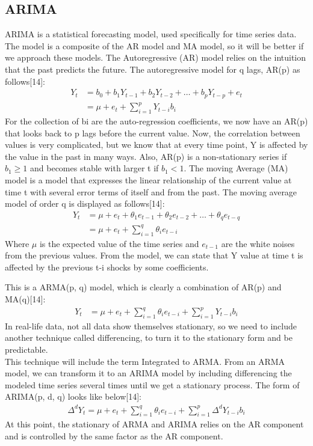 \documentclass{ieeeojies}
\begin{document}
\subsection{ARIMA}
ARIMA is a statistical forecasting model, used specifically for time series data. The model is a composite of the AR model and MA model, so it will be better if we approach these models.
The Autoregressive (AR) model relies on the intuition that the past predicts the future. The autoregressive model for q lags, AR(p) as follows[14]:
\begin{align*}
  Y_t &= b_0 + b_1 Y_{t-1} + b_2 Y_{t-2} + \ldots + b_p Y_{t-p} + e_t \\
      &= \mu + e_t + \sum_{i=1}^{p} Y_{t-i}b_i
\end{align*}
\indent For the collection of bi are the auto-regression coefficients, we now have an AR(p) that looks back to p lags before the current value. Now, the correlation between values is very complicated, but we know that at every time point, Y is affected by the value in the past in many ways. Also, AR(p) is a non-stationary series if $b_1 \geq 1$ and becomes stable with larger t if $b_1 < 1$.
The moving Average (MA) model is a model that expresses the linear relationship of the current value at time t with several error terms of itself and from the past. The moving average model of order q is displayed as follows[14]:
\begin{align*}
Y_t &= \mu + e_t + \theta_1 e_{t-1} + \theta_2 e_{t-2} + \ldots + \theta_q e_{t-q} \\
    &= \mu + e_t + \sum_{i=1}^{q} \theta_i e_{t-i}
\end{align*}
\indent Where $\mu $ is the expected value of the time series and $e_{t-1}$ are the white noises from the previous values. From the model, we can state that Y value at time t is affected by the previous t-i shocks by some coefficients.  

This is a ARMA(p, q) model, which is clearly a combination of AR(p) and MA(q)[14]:
\begin{align*}
Y_t &= \mu + e_t + \sum_{i=1}^{q} \theta_i e_{t-i} + \sum_{i=1}^{p} Y_{t-i} b_i
\end{align*}
In real-life data, not all data show themselves stationary, so we need to include another technique called differencing, to turn it to the stationary form and be predictable.\\
\indent This technique will include the term Integrated to ARMA. From an ARMA model, we can transform it to an ARIMA model by including differencing the modeled time series several times until we get a stationary process. The form of ARIMA(p, d, q) looks like below[14]:
\begin{align*}
\Delta^d Y_t = \mu + e_t + \sum_{i=1}^{q} \theta_i e_{t-i} + \sum_{i=1}^{p} \Delta^d Y_{t-i} b_i
\end{align*}
At this point, the stationary of ARMA and ARIMA relies on the AR component and is controlled by the same factor as the AR component.
\end{document}
